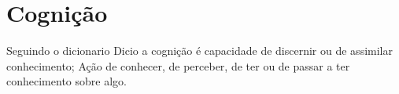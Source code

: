 
\chapter{Cognição}%
\label{cap:aprendizagem}

\begin{definition}[Cognição]
Seguindo o dicionario Dicio \cite{diciocognicao} a cognição é 
capacidade de discernir ou de assimilar conhecimento; 
Ação de conhecer, de perceber, de ter ou de passar a ter conhecimento sobre algo.
\end{definition}












